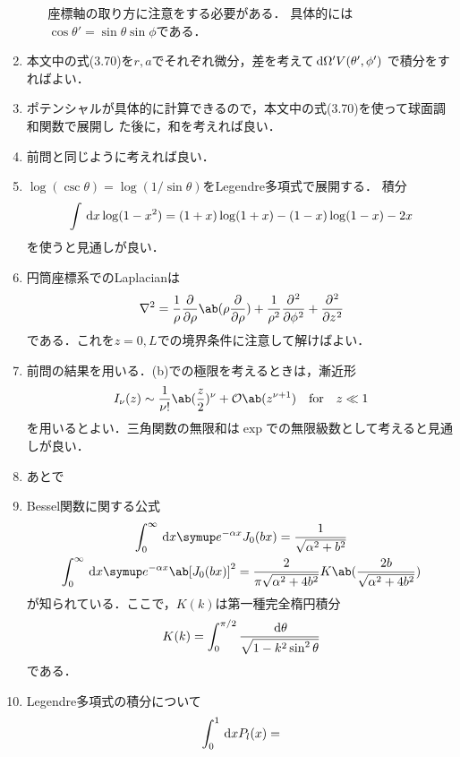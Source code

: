 \begin{enumerate}[label={\large 3.\arabic*}]
\begin{enumerate}[(a)]
        座標軸の取り方に注意をする必要がある．
        具体的には$\cos\theta' = \sin\theta \sin\phi$である．
    \end{enumerate}%
  \item 本文中の式(3.70)を$r,a$でそれぞれ微分，差を考えて$\dl{\Omega'} V(\theta',\phi')$
    で積分をすればよい．
  \item ポテンシャルが具体的に計算できるので，本文中の式(3.70)を使って球面調和関数で展開し
    た後に，和を考えれば良い．
  \item 前問と同じように考えれば良い．
  \item $\log(\csc\theta) = \log(1/\sin\theta)$をLegendre多項式で展開する．
    積分
    \begin{gather}%
      \int \dl{x} \log(1-x^2) = (1+x)\log(1+x) - (1-x)\log(1-x) - 2x
    \end{gather}%
    を使うと見通しが良い．
  \item 円筒座標系でのLaplacianは
    \begin{gather}%
      \gr^2 = \frac{1}{\rho}\diffp**{\rho}{\ab(\rho\diffp{}{\rho})} + \frac{1}{\rho^2} \diffp[2]{}{\phi} + \diffp[2]{}{z}
    \end{gather}%
    である．これを$z=0,L$での境界条件に注意して解けばよい．
  \item 前問の結果を用いる．(b)での極限を考えるときは，漸近形
    \begin{gather}%
      I_\nu(z) \sim \frac{1}{\nu !}\ab(\frac{z}{2})^\nu + \order{z^{\nu+1}} \qqtext{for} z \ll 1
    \end{gather}%
    を用いるとよい．三角関数の無限和は$\exp$での無限級数として考えると見通しが良い．
  \item あとで
  \item Bessel関数に関する公式
    \begin{gather}%
      \int_0^\infty \dl{x} \e^{-\alpha x} J_0(bx) = \frac{1}{\sqrt{\alpha^2 + b^2}}\\
      \int_0^\infty \dl{x} \e^{-\alpha x} \ab[J_0(bx)]^2 = \frac{2}{\pi \sqrt{\alpha^2 + 4b^2}} 
      K\ab(\frac{2b}{\sqrt{\alpha^2 + 4b^2}})
    \end{gather}%
    が知られている．ここで，$K(k)$は第一種完全楕円積分
    \begin{gather}%
      K(k) = \int_0^{\pi/2} \frac{\dl{\theta}}{\sqrt{1-k^2\sin^2\theta}}
    \end{gather}%
    である．
  \item Legendre多項式の積分について
    \begin{gather}%
      \int_0^1 \dl{x} P_l(x) =

\end{gather}
\end{enumerate}
